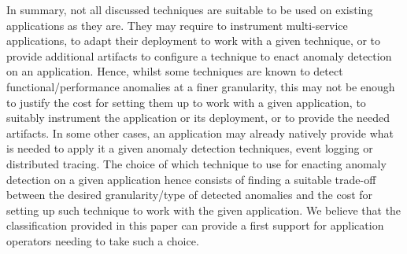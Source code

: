 In summary, not all discussed techniques are suitable to be used on existing applications as they are.
They may require to instrument multi-service applications, to adapt their deployment to work with a given technique, or to provide additional artifacts to configure a technique to enact anomaly detection on an application.
Hence, whilst some techniques are known to detect functional/performance anomalies at a finer granularity, this may not be enough to justify the cost for setting them up to work with a given application, \viz to suitably instrument the application or its deployment, or to provide the needed artifacts.
In some other cases, an application may already natively provide what is needed to apply it a given anomaly detection techniques, \eg event logging or distributed tracing.
The choice of which technique to use for enacting anomaly detection on a given application hence consists of finding a suitable trade-off between the desired granularity/type of detected anomalies and the cost for setting up such technique to work with the given application. 
We believe that the classification provided in this paper can provide a first support for application operators needing to take such a choice.

